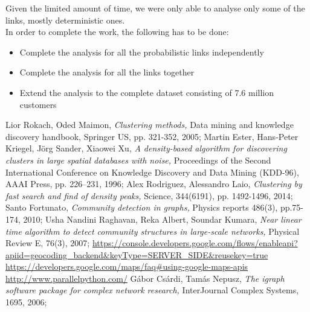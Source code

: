 \documentclass[a4paper,11pt]{book}
\begin{document}
Given the limited amount of time, we were only able to analyse only some of the links, mostly deterministic ones.\\
In order to complete the work, the following has to be done:
\begin{itemize}
\item Complete the analysis for all the probabilistic links independently
\item Complete the analysis for all the links together
\item Extend the analysis to the complete dataset consisting of 7.6 million customers
\end{itemize}
\newpage
\begin{thebibliography}{8}
  Lior Rokach, Oded Maimon, {\em Clustering methods,} Data mining and knowledge discovery handbook, Springer US, pp. 321-352, 2005;
  Martin Ester, Hans-Peter Kriegel, Jörg Sander, Xiaowei Xu, {\em A density-based algorithm for discovering clusters in large spatial databases with noise,} Proceedings of the Second International Conference on Knowledge Discovery and Data Mining (KDD-96), AAAI Press, pp. 226–231, 1996;
  Alex Rodriguez, Alessandro Laio, {\em Clustering by fast search and find of density peaks,} Science, 344(6191), pp. 1492-1496, 2014;
  Santo Fortunato, {\em Community detection in graphs,} Physics reports 486(3), pp.75-174, 2010;
  Usha Nandini Raghavan, Reka Albert, Soundar Kumara, {\em Near linear time algorithm to detect community structures in large-scale networks,} Physical Review E, 76(3), 2007;
  \url{https://console.developers.google.com/flows/enableapi?apiid=geocoding_backend&keyType=SERVER_SIDE&reusekey=true}
 \url{https://developers.google.com/maps/faq#using-google-maps-apis} 
 \url{http://www.parallelpython.com/}
 Gábor Csárdi, Tamás Nepusz, {\em The igraph software package for complex network research,} InterJournal Complex Systems, 1695, 2006;
\end{thebibliography}
\end{document}
